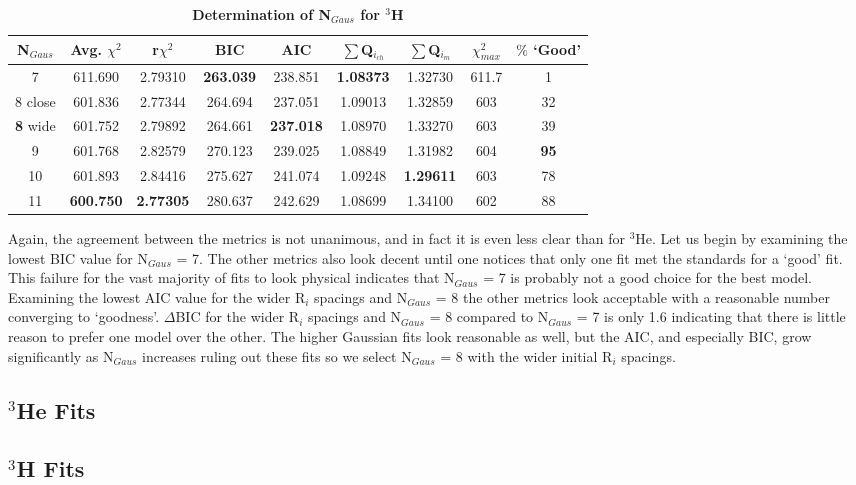 \begin{table}[!h]
\centering
\begin{tabular}{|c c c c c c c c c|}
\hline
\textbf{N$_{Gaus}$} & \textbf{Avg. $\chi^2$} & \textbf{r$\chi^2$} & \textbf{BIC} & \textbf{AIC} & \textbf{$\sum$Q$_{i_{ch}}$} & \textbf{$\sum$Q$_{i_{m}}$} & \textbf{$\chi^2_{max}$} & \textbf{$\%$ `Good'} \\
\hline
7 & 611.690 & 2.79310 & \textbf{263.039} & 238.851 & \textbf{1.08373} & 1.32730 & 611.7 & 1\\
8 close & 601.836 & 2.77344 & 264.694 & 237.051 & 1.09013 & 1.32859 & 603 & 32\\
\textbf{8} wide & 601.752 & 2.79892 & 264.661 & \textbf{237.018} & 1.08970 & 1.33270 & 603 & 39\\
9 & 601.768 & 2.82579 & 270.123 & 239.025 & 1.08849 & 1.31982 & 604 & \textbf{95}\\
10 & 601.893 & 2.84416 & 275.627 & 241.074 & 1.09248 & \textbf{1.29611} & 603 & 78\\
11 & \textbf{600.750} & \textbf{2.77305} & 280.637 & 242.629 & 1.08699 & 1.34100 & 602 & 88\\
\hline
\end{tabular}
\caption{\bf{Determination of N$_{Gaus}$ for $^3$H}}
\label{tab:3h_ngaus}
\end{table}

Again, the agreement between the metrics is not unanimous, and in fact it is even less clear than for $^3$He. Let us begin by examining the lowest BIC value for N$_{Gaus}$ = 7. The other metrics also look decent until one notices that only one fit met the standards for a `good' fit. This failure for the vast majority of fits to look physical indicates that N$_{Gaus}$ = 7 is probably not a good choice for the best model. Examining the lowest AIC value for the wider R$_i$ spacings and N$_{Gaus}$ = 8 the other metrics look acceptable with a reasonable number converging to `goodness'. $\Delta$BIC for the wider R$_i$ spacings and N$_{Gaus}$ = 8 compared to N$_{Gaus}$ = 7 is only 1.6 indicating that there is little reason to prefer one model over the other. The higher Gaussian fits look reasonable as well, but the AIC, and especially BIC, grow significantly as N$_{Gaus}$ increases ruling out these fits so we select N$_{Gaus}$ = 8 with the wider initial R$_i$ spacings.

\subsection{$^3$He Fits}
\label{ssec:3he_fits}

\subsection{$^3$H Fits}
\label{ssec:3h_fits}
